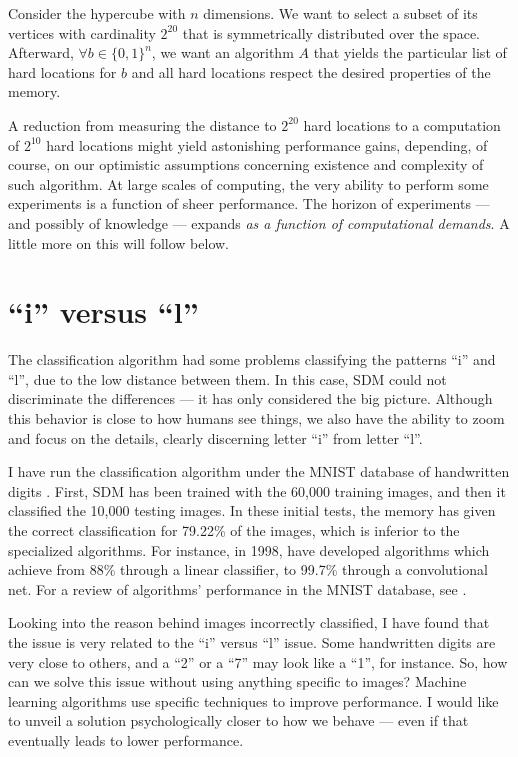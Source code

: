 Consider the hypercube with $n$ dimensions.  We want to select a subset of its vertices with cardinality $2^{20}$ that is symmetrically distributed over the space. Afterward, $\forall b \in \{ 0,1\} ^n$, we want an algorithm $A$ that yields the particular list of hard locations for $b$ and all hard locations respect the desired properties of the memory.

A reduction from measuring the distance to $2^{20}$ hard locations to a computation of $2^{10}$ hard locations might yield astonishing performance gains, depending, of course, on our optimistic assumptions concerning existence and complexity of such algorithm.  At large scales of computing, the very ability to perform some experiments is a function of sheer performance. The horizon of experiments --- and possibly of knowledge --- expands \emph{as a function of computational demands}. A little more on this will follow below.




\section{``i'' versus ``l''}

The classification algorithm had some problems classifying the patterns ``i'' and ``l'', due to the low distance between them. In this case, SDM could not discriminate the differences --- it has only considered the big picture. Although this behavior is close to how humans see things, we also have the ability to zoom and focus on the details, clearly discerning letter ``i'' from letter ``l''.

I have run the classification algorithm under the MNIST database of handwritten digits \citep{deng2012mnist}. First, SDM has been trained with the 60,000 training images, and then it classified the 10,000 testing images. In these initial tests, the memory has given the correct classification for 79.22\% of the images, which is inferior to the specialized algorithms. For instance, in 1998, \citet{lecun1998gradient} have developed algorithms which achieve from 88\% through a linear classifier, to 99.7\% through a convolutional net. For a review of algorithms' performance in the MNIST database, see \cite{mnist}.

Looking into the reason behind images incorrectly classified, I have found that the issue is very related to the ``i'' versus ``l'' issue. Some handwritten digits are very close to others, and a ``2'' or a ``7'' may look like a ``1'', for instance. So, how can we solve this issue without using anything specific to images?  Machine learning algorithms use specific techniques to improve performance. I would like to unveil a solution psychologically closer to how we behave --- even if that eventually leads to lower performance.

